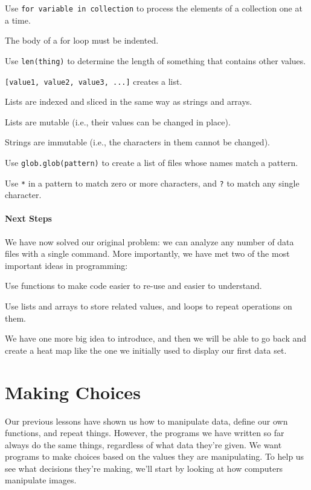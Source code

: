\documentclass{book}
\begin{document}
\begin{swcitemize}
\item
  Use \texttt{for variable in collection} to process the elements of a
  collection one at a time.
\item
  The body of a for loop must be indented.
\item
  Use \texttt{len(thing)} to determine the length of something that
  contains other values.
\item
  \texttt{{[}value1, value2, value3, ...{]}} creates a list.
\item
  Lists are indexed and sliced in the same way as strings and arrays.
\item
  Lists are mutable (i.e., their values can be changed in place).
\item
  Strings are immutable (i.e., the characters in them cannot be
  changed).
\item
  Use \texttt{glob.glob(pattern)} to create a list of files whose names
  match a pattern.
\item
  Use \texttt{*} in a pattern to match zero or more characters, and
  \texttt{?} to match any single character.
\end{swcitemize}

\mbox{}\paragraph{Next Steps}

We have now solved our original problem: we can analyze any number of
data files with a single command. More importantly, we have met two of
the most important ideas in programming:

\begin{swcenumerate}
\item
  Use functions to make code easier to re-use and easier to understand.
\item
  Use lists and arrays to store related values, and loops to repeat
  operations on them.
\end{swcenumerate}

We have one more big idea to introduce, and then we will be able to go
back and create a heat map like the one we initially used to display our
first data set.

\section{Making Choices}

Our previous lessons have shown us how to manipulate data, define our
own functions, and repeat things. However, the programs we have written
so far always do the same things, regardless of what data they're given.
We want programs to make choices based on the values they are
manipulating. To help us see what decisions they're making, we'll start
by looking at how computers manipulate images.
\end{document}
